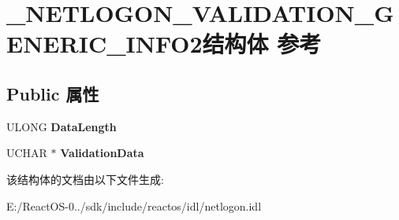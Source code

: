 \hypertarget{struct___n_e_t_l_o_g_o_n___v_a_l_i_d_a_t_i_o_n___g_e_n_e_r_i_c___i_n_f_o2}{}\section{\+\_\+\+N\+E\+T\+L\+O\+G\+O\+N\+\_\+\+V\+A\+L\+I\+D\+A\+T\+I\+O\+N\+\_\+\+G\+E\+N\+E\+R\+I\+C\+\_\+\+I\+N\+F\+O2结构体 参考}
\label{struct___n_e_t_l_o_g_o_n___v_a_l_i_d_a_t_i_o_n___g_e_n_e_r_i_c___i_n_f_o2}
\subsection*{Public 属性}
\begin{DoxyCompactItemize}
\item 
\mbox{\label{struct___n_e_t_l_o_g_o_n___v_a_l_i_d_a_t_i_o_n___g_e_n_e_r_i_c___i_n_f_o2_a7c2749b4d2a4611f685aa57edbfe159e}} 
U\+L\+O\+NG {\bfseries Data\+Length}
\item 
\mbox{\label{struct___n_e_t_l_o_g_o_n___v_a_l_i_d_a_t_i_o_n___g_e_n_e_r_i_c___i_n_f_o2_a0dc429cca4a2338a4bacc414d694eb06}} 
U\+C\+H\+AR $\ast$ {\bfseries Validation\+Data}
\end{DoxyCompactItemize}


该结构体的文档由以下文件生成\+:\begin{DoxyCompactItemize}
\item 
E\+:/\+React\+O\+S-\/0../sdk/include/reactos/idl/netlogon.\+idl\end{DoxyCompactItemize}
